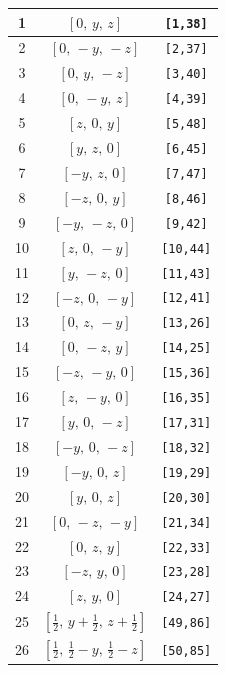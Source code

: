 \documentclass[fleqn,8pt]{jsarticle}
\begin{document}
\begin{longtable}{ccc}
1 & $\left[ 0,\, y,\, z \right]$ & {\tt [1,38]} \\ \hline
2 & $\left[ 0,\, - y,\, - z \right]$ & {\tt [2,37]} \\ \hline
3 & $\left[ 0,\, y,\, - z \right]$ & {\tt [3,40]} \\ \hline
4 & $\left[ 0,\, - y,\, z \right]$ & {\tt [4,39]} \\ \hline
5 & $\left[ z,\, 0,\, y \right]$ & {\tt [5,48]} \\ \hline
6 & $\left[ y,\, z,\, 0 \right]$ & {\tt [6,45]} \\ \hline
7 & $\left[ - y,\, z,\, 0 \right]$ & {\tt [7,47]} \\ \hline
8 & $\left[ - z,\, 0,\, y \right]$ & {\tt [8,46]} \\ \hline
9 & $\left[ - y,\, - z,\, 0 \right]$ & {\tt [9,42]} \\ \hline
10 & $\left[ z,\, 0,\, - y \right]$ & {\tt [10,44]} \\ \hline
11 & $\left[ y,\, - z,\, 0 \right]$ & {\tt [11,43]} \\ \hline
12 & $\left[ - z,\, 0,\, - y \right]$ & {\tt [12,41]} \\ \hline
13 & $\left[ 0,\, z,\, - y \right]$ & {\tt [13,26]} \\ \hline
14 & $\left[ 0,\, - z,\, y \right]$ & {\tt [14,25]} \\ \hline
15 & $\left[ - z,\, - y,\, 0 \right]$ & {\tt [15,36]} \\ \hline
16 & $\left[ z,\, - y,\, 0 \right]$ & {\tt [16,35]} \\ \hline
17 & $\left[ y,\, 0,\, - z \right]$ & {\tt [17,31]} \\ \hline
18 & $\left[ - y,\, 0,\, - z \right]$ & {\tt [18,32]} \\ \hline
19 & $\left[ - y,\, 0,\, z \right]$ & {\tt [19,29]} \\ \hline
20 & $\left[ y,\, 0,\, z \right]$ & {\tt [20,30]} \\ \hline
21 & $\left[ 0,\, - z,\, - y \right]$ & {\tt [21,34]} \\ \hline
22 & $\left[ 0,\, z,\, y \right]$ & {\tt [22,33]} \\ \hline
23 & $\left[ - z,\, y,\, 0 \right]$ & {\tt [23,28]} \\ \hline
24 & $\left[ z,\, y,\, 0 \right]$ & {\tt [24,27]} \\ \hline
25 & $\left[ \frac{1}{2},\, y + \frac{1}{2},\, z + \frac{1}{2} \right]$ & {\tt [49,86]} \\ \hline
26 & $\left[ \frac{1}{2},\, \frac{1}{2} - y,\, \frac{1}{2} - z \right]$ & {\tt [50,85]} \\ \hline

\end{longtable}
\end{document}
